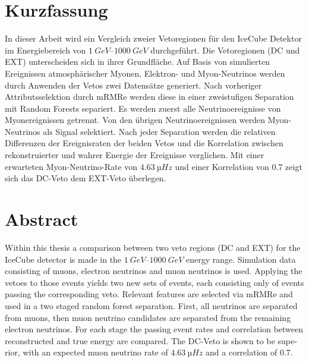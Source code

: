 \thispagestyle{plain}

\section*{Kurzfassung}
In dieser Arbeit wird ein Vergleich zweier Vetoregionen für den IceCube Detektor im Energiebereich von $\SIrange{1}{1000}{GeV}$ durchgeführt.
Die Vetoregionen (DC und EXT) unterscheiden sich in ihrer Grundfläche.
Auf Basis von simulierten Ereignissen atmosphärischer Myonen, Elektron- und Myon-Neutrinos werden durch Anwenden der Vetos zwei Datensätze generiert. 
Nach vorheriger Attributsselektion durch mRMRe werden diese in einer zweistufigen Separation mit Random Forests separiert. 
Es werden zuerst alle Neutrinoereignisse von Myonereignissen getrennt.
Von den übrigen Neutrinoereignissen werden Myon-Neutrinos als Signal selektiert.
Nach jeder Separation werden die relativen Differenzen der Ereignisraten der beiden Vetos und die Korrelation zwischen rekonstruierter und wahrer Energie der Ereignisse verglichen.
Mit einer erwarteten Myon-Neutrino-Rate von $\SI{4.63}{µHz}$ und einer Korrelation von 0.7 zeigt sich das DC-Veto dem EXT-Veto überlegen.

\section*{Abstract}
\begin{english}
    Within this thesis a comparison between two veto regions (DC and EXT) for the IceCube detector is made in the $\SIrange{1}{1000}{GeV}$ energy range.
    Simulation data consisting of muons, electron neutrinos and muon neutrinos is used.
    Applying the vetoes to those events yields two new sets of events, each consisting only of events passing the corresponding veto.
    Relevant features are selected via mRMRe and used in a two staged random forest separation.
    First, all neutrinos are separated from muons, then muon neutrino candidates are separated from the remaining electron neutrinos.
    For each stage the passing event rates and correlation between reconstructed and true energy are compared.
    The DC-Veto is shown to be superior, with an expected muon neutrino rate of $\SI{4.63}{µHz}$ and a correlation of 0.7.
\end{english}
